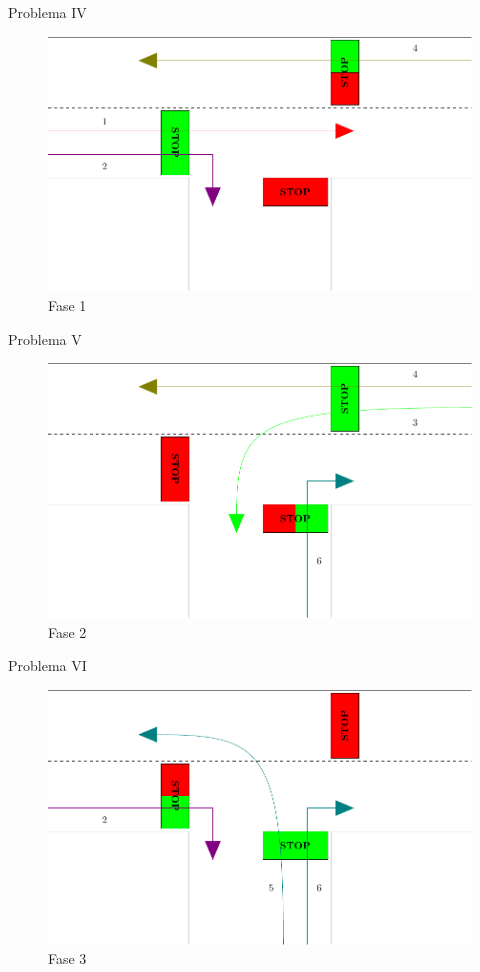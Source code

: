 \documentclass{beamer}
\begin{document}
\begin{frame}{Problema IV}
\begin{figure}
\includegraphics[height=0.75\textheight]{img/incrocio_p1}
\caption{Fase 1}\label{fig:fase1}
\end{figure}
\end{frame}

\begin{frame}{Problema V}
\begin{figure}
\includegraphics[height=0.75\textheight]{img/incrocio_p2}
\caption{Fase 2}\label{fig:fase2}
\end{figure}
\end{frame}

\begin{frame}{Problema VI}
\begin{figure}
\includegraphics[height=0.75\textheight]{img/incrocio_p3}
\caption{Fase 3}\label{fig:fase3}
\end{figure}
\end{frame}
\end{document}
